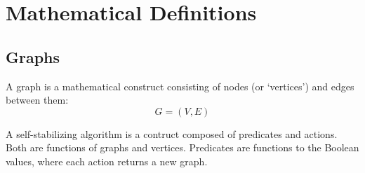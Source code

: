 
\section{Mathematical Definitions}
\label{sec:math-defin}

\subsection{Graphs}
\label{sec:graphs}

A \gls{graph} is a mathematical construct
  consisting of \glspl{node} (or `vertices') and \glspl{edge} between them:
  \[ G = (V, E) \]

A self-stabilizing algorithm is a contruct composed of
  \glspl{predicate} and \glspl{action}.
Both are functions of graphs and vertices.
Predicates are functions to the Boolean values,
  where each action returns a new graph.


